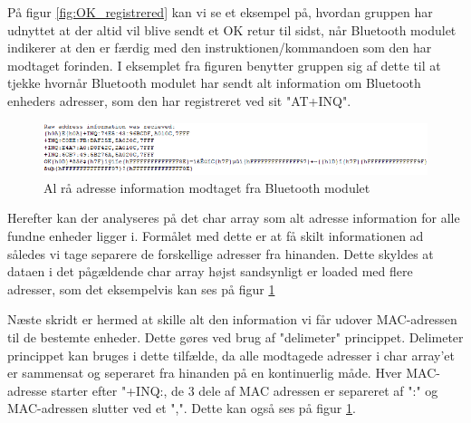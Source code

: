 På figur \ref{fig:OK_registrered} kan vi se et eksempel på, hvordan gruppen har udnyttet at der altid vil blive sendt et OK retur til sidst, når Bluetooth modulet indikerer at den er færdig med den instruktionen/kommandoen som den har modtaget forinden. I eksemplet fra figuren benytter gruppen sig af dette til at tjekke hvornår Bluetooth modulet har sendt alt information om Bluetooth enheders adresser, som den har registreret ved sit "AT+INQ".

\begin{figure}[H]
	\centering
	\includegraphics[width = 500 pt]{Img/raw_address.PNG}
	\caption{Al rå adresse information modtaget fra Bluetooth modulet}
	\label{fig:raw_address}
\end{figure}

Herefter kan der analyseres på det char array som alt adresse information for alle fundne enheder ligger i. Formålet med dette er at få skilt informationen ad således vi tage separere de forskellige adresser fra hinanden. Dette skyldes at dataen i det pågældende char array højst sandsynligt er loaded med flere adresser, som det eksempelvis kan ses på figur \ref{fig:raw_address}

Næste skridt er hermed at skille alt den information vi får udover MAC-adressen til de bestemte enheder. Dette gøres ved brug af "delimeter" princippet. Delimeter princippet kan bruges i dette tilfælde, da alle modtagede adresser i char array'et er sammensat og seperaret fra hinanden på en kontinuerlig måde. Hver MAC-adresse starter efter "+INQ:, de 3 dele af MAC adressen er separeret af ":" og MAC-adressen slutter ved et ",". Dette kan også ses på figur \ref{fig:raw_address}.



